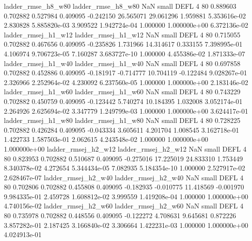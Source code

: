       ladder_rmse_h8_w80       ladder_rmse_h8_w80                   NaN      small     DEFL                 4 80 0.889603       0.702882 0.527984       0.409095   -0.242150     26.565071     29.061296     1.959881   5.353616e-02  2.830828 5.885820e-03     3.909522   1.942724e-04            1.000000    1.000000e+00        6.372136e-02
     ladder_rmsej_h1_w12      ladder_rmsej_h1_w12                   NaN      small     DEFL                 4 80 0.715055       0.702882 0.467656       0.409095   -0.235826      1.731966     14.314617     0.333155   7.398995e-01  4.106974 9.706723e-05     7.160287   3.683727e-10            1.000000    4.455386e-02        1.871333e-07
     ladder_rmsej_h1_w40      ladder_rmsej_h1_w40                   NaN      small     DEFL                 4 80 0.697858       0.702882 0.452886       0.409095   -0.181917     -0.714777     10.704119    -0.122484   9.028267e-01  2.326966 2.252964e-02     4.230092   6.237560e-05            1.000000    1.000000e+00        2.183146e-02
     ladder_rmsej_h1_w60      ladder_rmsej_h1_w60                   NaN      small     DEFL                 4 80 0.743229       0.702882 0.450759       0.409095   -0.123442      5.740274     10.184395     1.032008   3.052174e-01  2.264926 2.625694e-02     3.347779   1.249799e-03            1.000000    1.000000e+00        3.624417e-01
     ladder_rmsej_h1_w80      ladder_rmsej_h1_w80                   NaN      small     DEFL                 4 80 0.728225       0.702882 0.426284       0.409095   -0.043334      3.605611      4.201704     1.008545   3.162718e-01  1.422733 1.587503e-01     2.062615   4.243548e-02            1.000000    1.000000e+00        1.000000e+00
     ladder_rmsej_h2_w12      ladder_rmsej_h2_w12                   NaN      small     DEFL                 4 80 0.823953       0.702882 0.510687       0.409095   -0.275016     17.225019     24.833310     1.753449   8.340378e-02  4.272654 5.344434e-05     7.082935   5.184354e-10            1.000000    2.527917e-02        2.628467e-07
     ladder_rmsej_h2_w40      ladder_rmsej_h2_w40                   NaN      small     DEFL                 4 80 0.702806       0.702882 0.455808       0.409095   -0.182935     -0.010775     11.418569    -0.001970   9.984335e-01  2.459728 1.608812e-02     3.999559   1.419208e-04            1.000000    1.000000e+00        4.740156e-02
     ladder_rmsej_h2_w60      ladder_rmsej_h2_w60                   NaN      small     DEFL                 4 80 0.735978       0.702882 0.448556       0.409095   -0.122272      4.708631      9.645681     0.872226   3.857282e-01  2.187425 3.166840e-02     3.306664   1.422231e-03            1.000000    1.000000e+00        4.024913e-01
